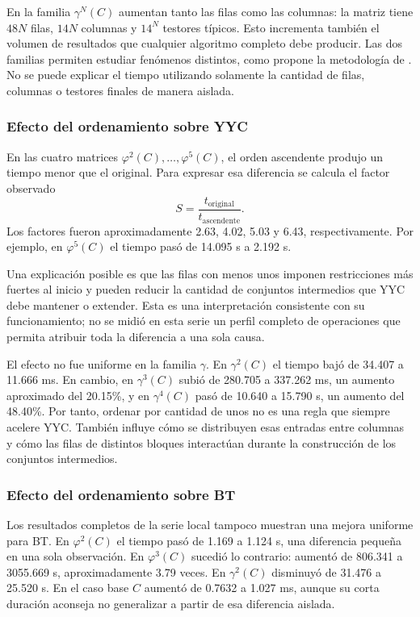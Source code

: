 En la familia $\gamma^N(C)$ aumentan tanto las filas como las columnas:
la matriz tiene $48N$ filas, $14N$ columnas y $14^N$ testores típicos.
Esto incrementa también el volumen de resultados que cualquier
algoritmo completo debe producir. Las dos familias permiten estudiar
fenómenos distintos, como propone la metodología de \cite{alba2016}.
No se puede explicar el tiempo utilizando solamente la cantidad de
filas, columnas o testores finales de manera aislada.

\subsubsection*{Efecto del ordenamiento sobre YYC}

En las cuatro matrices $\varphi^2(C),\ldots,\varphi^5(C)$, el orden
ascendente produjo un tiempo menor que el original. Para expresar
esa diferencia se calcula el factor observado
\[
S=\frac{t_{\mathrm{original}}}{t_{\mathrm{ascendente}}}.
\]
Los factores fueron aproximadamente 2.63, 4.02, 5.03 y 6.43,
respectivamente. Por ejemplo, en $\varphi^5(C)$ el tiempo pasó de
14.095 s a 2.192 s.

Una explicación posible es que las filas con menos unos imponen
restricciones más fuertes al inicio y pueden reducir la cantidad de
conjuntos intermedios que YYC debe mantener o extender. Esta es una
interpretación consistente con su funcionamiento; no se midió en esta
serie un perfil completo de operaciones que permita atribuir toda
la diferencia a una sola causa.

El efecto no fue uniforme en la familia $\gamma$. En $\gamma^2(C)$
el tiempo bajó de 34.407 a 11.666 ms. En cambio, en $\gamma^3(C)$
subió de 280.705 a 337.262 ms, un aumento aproximado del 20.15\%,
y en $\gamma^4(C)$ pasó de 10.640 a 15.790 s, un aumento del 48.40\%.
Por tanto, ordenar por cantidad de unos no es una regla que siempre
acelere YYC. También influye cómo se distribuyen esas entradas entre
columnas y cómo las filas de distintos bloques interactúan durante
la construcción de los conjuntos intermedios.

\subsubsection*{Efecto del ordenamiento sobre BT}

Los resultados completos de la serie local tampoco muestran una
mejora uniforme para BT. En $\varphi^2(C)$ el tiempo pasó de 1.169
a 1.124 s, una diferencia pequeña en una sola observación.
En $\varphi^3(C)$ sucedió lo contrario: aumentó de 806.341 a
3055.669 s, aproximadamente 3.79 veces. En $\gamma^2(C)$ disminuyó
de 31.476 a 25.520 s. En el caso base $C$ aumentó de 0.7632 a
1.027 ms, aunque su corta duración aconseja no generalizar a partir
de esa diferencia aislada.

